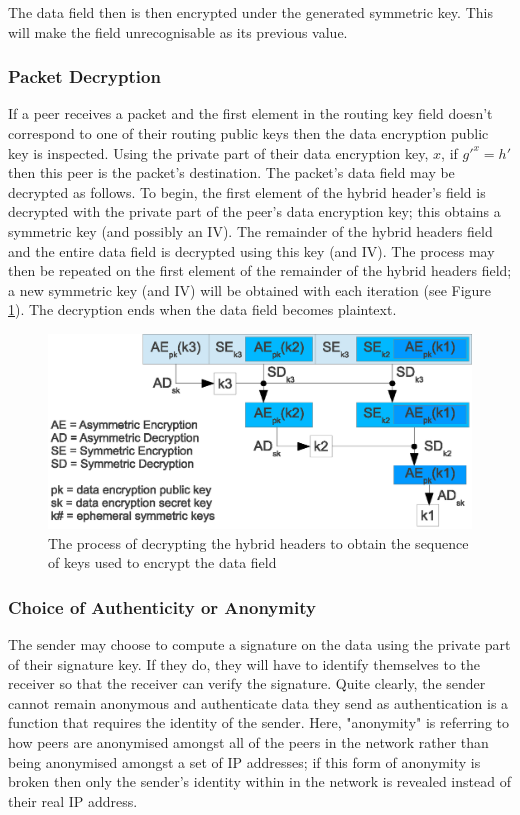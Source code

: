 \documentclass[ %
                    author={Luke Murray},
                supervisor={Dr. Simon Hollis},
                     title={Shadow Peer-to-Peer Networks},
                  subtitle={},
                    degree={MEng},
                      year={2013} ]{thesis}
\begin{document}
The data field then is then encrypted under the generated symmetric key. This will make the field unrecognisable as its previous value.

\subsubsection{Packet Decryption}

If a peer receives a packet and the first element in the routing key field doesn't correspond to one of their routing public keys then the data encryption public key is inspected. Using the private part of their data encryption key, $x$, if $g\prime^{x} = h\prime$ then this peer is the packet's destination. The packet's data field may be decrypted as follows. To begin, the first element of the hybrid header's field is decrypted with the private part of the peer's data encryption key; this obtains a symmetric key (and possibly an IV). The remainder of the hybrid headers field and the entire data field is decrypted using this key (and IV). The process may then be repeated on the first element of the remainder of the hybrid headers field; a new symmetric key (and IV) will be obtained with each iteration (see Figure \ref{hybrid_decrypt}). The decryption ends when the data field becomes plaintext.

\begin{figure}[h]
    \centering
    \includegraphics{diagrams/hybrid_header_decryption2.eps}
    \caption{The process of decrypting the hybrid headers to obtain the sequence of keys used to encrypt the data field}
    \label{hybrid_decrypt}
\end{figure}

\subsubsection{Choice of Authenticity or Anonymity}

The sender may choose to compute a signature on the data using the private part of their signature key. If they do, they will have to identify themselves to the receiver so that the receiver can verify the signature. Quite clearly, the sender cannot remain anonymous and authenticate data they send as authentication is a function that requires the identity of the sender. Here, "anonymity" is referring to how peers are anonymised amongst all of the peers in the network rather than being anonymised amongst a set of IP addresses; if this form of anonymity is broken then only the sender's identity within in the network is revealed instead of their real IP address.
\end{document}

